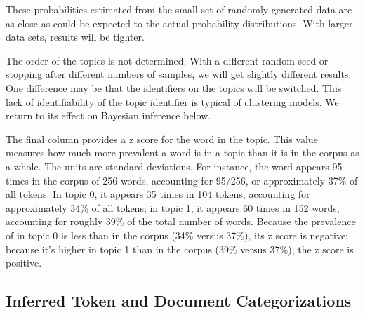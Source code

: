 These probabilities estimated from the small set of randomly generated
data are as close as could be expected to the actual probability
distributions.  With larger data sets, results will be tighter.

The order of the topics is not determined.  With a different random
seed or stopping after different numbers of samples, we will get
slightly different results.  One difference may be that the
identifiers on the topics will be switched.  This lack of
identifiability of the topic identifier is typical of clustering
models.  We return to its effect on Bayesian inference below.

The final column provides a z score for the word in the topic.  This
value measures how much more prevalent a word is in a topic than it is
in the corpus as a whole.  The units are standard deviations.  For
instance, the word  appears 95 times in the corpus
of 256 words, accounting for 95/256, or approximately 37\% of all
tokens.  In topic 0, it appears 35 times in 104 tokens, accounting for
approximately 34\% of all tokens; in topic 1, it appears 60 times in
152 words, accounting for roughly 39\% of the total number of words.
Because the prevalence of  in topic 0 is less than
in the corpus (34\% versus 37\%), its z score is negative; because
it's higher in topic 1 than in the corpus (39\% versus 37\%), the z
score is positive.   

\subsection{Inferred Token and Document Categorizations}

